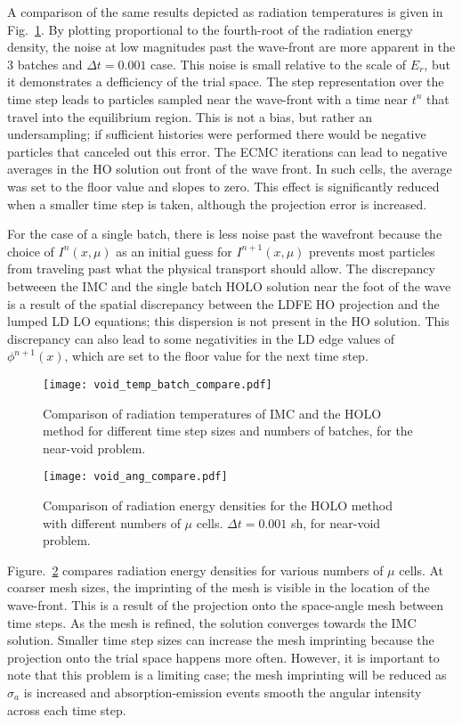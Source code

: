 A comparison of the same results depicted as radiation temperatures is given in Fig.~\ref{fig:void_temp_compare}.  By plotting
proportional to the fourth-root of the radiation energy density, the noise at low
magnitudes past the wave-front are more apparent in the 3 batches and $\Delta t = 0.001$
case.  This noise is small relative to the scale of $E_r$, but it demonstrates a
defficiency of the trial space.  The step representation over
the time step leads to particles sampled near the wave-front with a time near
$t^{n}$ that travel into the equilibrium region.  This is not a
bias, but rather an undersampling; if sufficient histories were performed there
would be negative particles that canceled out this error. The ECMC iterations can lead to negative
averages in the HO solution out front of the wave front.  In such cells, the
average was set to the floor value and slopes to zero. This effect is
significantly reduced when a smaller time step is taken, although the projection error is
increased.

For the case of a single batch, 
there is less noise past the wavefront because the
choice of $I^{n}(x,\mu)$ as an initial guess for $I^{n+1}(x,\mu)$ prevents most particles from
traveling past what the physical transport should allow.  The discrepancy betweeen the IMC
and the single batch HOLO solution near the foot of
the wave is a result of the spatial discrepancy between the LDFE HO projection and the
lumped LD LO equations; this dispersion is not present in the HO solution.  This
discrepancy can also lead to some negativities in the LD edge values of
$\phi^{n+1}(x)$, which are set to the floor value for the next time step. 
\begin{figure}[H]
  \centering
    \texttt{[image: void\_temp\_batch\_compare.pdf]}
    \caption{\label{fig:void_temp_compare} Comparison of radiation temperatures of IMC and
    the HOLO method for different time step sizes and numbers of batches, for the
near-void problem.}
\end{figure}

\begin{figure}[H]
  \centering
    \texttt{[image: void\_ang\_compare.pdf]}
    \caption{\label{fig:bumps} Comparison of radiation energy densities for
    the HOLO method with different numbers of $\mu$ cells. $\Delta t=0.001$ sh, for
near-void problem.}
\end{figure}

Figure.~\ref{fig:bumps} compares radiation energy densities for various numbers of $\mu$
cells.  At coarser mesh sizes, the imprinting of the mesh is visible in the location of
the wave-front.  This is a result of the projection onto the space-angle mesh between time
steps.  As the mesh is refined, the solution converges towards the IMC solution.  
Smaller time step sizes can increase the mesh imprinting because the projection onto the
trial space happens more often.  However, it is important to note that this problem is a
limiting case; the mesh imprinting will be reduced as $\sigma_a$ is increased and
absorption-emission events smooth the angular intensity across each time step.

